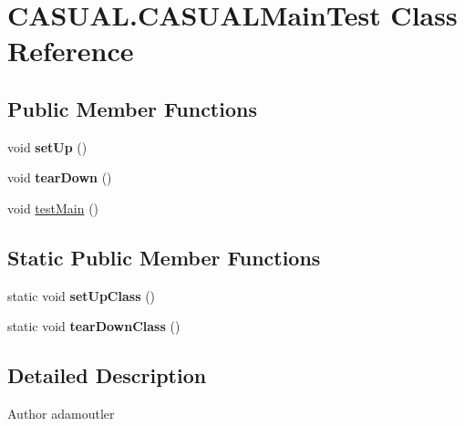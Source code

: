 \hypertarget{class_c_a_s_u_a_l_1_1_c_a_s_u_a_l_main_test}{\section{C\-A\-S\-U\-A\-L.\-C\-A\-S\-U\-A\-L\-Main\-Test Class Reference}
\label{class_c_a_s_u_a_l_1_1_c_a_s_u_a_l_main_test}
}
\subsection*{Public Member Functions}
\begin{DoxyCompactItemize}
\item 
\hypertarget{class_c_a_s_u_a_l_1_1_c_a_s_u_a_l_main_test_aaa9a6f2548a1164472025718f01ad379}{void {\bfseries set\-Up} ()}\label{class_c_a_s_u_a_l_1_1_c_a_s_u_a_l_main_test_aaa9a6f2548a1164472025718f01ad379}

\item 
\hypertarget{class_c_a_s_u_a_l_1_1_c_a_s_u_a_l_main_test_a156fc7ec34def13912d1a805e1be5f23}{void {\bfseries tear\-Down} ()}\label{class_c_a_s_u_a_l_1_1_c_a_s_u_a_l_main_test_a156fc7ec34def13912d1a805e1be5f23}

\item 
void \hyperlink{class_c_a_s_u_a_l_1_1_c_a_s_u_a_l_main_test_a642ce2577da1d802bd97845f9f505949}{test\-Main} ()
\end{DoxyCompactItemize}
\subsection*{Static Public Member Functions}
\begin{DoxyCompactItemize}
\item 
\hypertarget{class_c_a_s_u_a_l_1_1_c_a_s_u_a_l_main_test_a3ac9e539ca60959f5724998e15229e3c}{static void {\bfseries set\-Up\-Class} ()}\label{class_c_a_s_u_a_l_1_1_c_a_s_u_a_l_main_test_a3ac9e539ca60959f5724998e15229e3c}

\item 
\hypertarget{class_c_a_s_u_a_l_1_1_c_a_s_u_a_l_main_test_a6d123ab347d12ee1e3951fd6fd7aea91}{static void {\bfseries tear\-Down\-Class} ()}\label{class_c_a_s_u_a_l_1_1_c_a_s_u_a_l_main_test_a6d123ab347d12ee1e3951fd6fd7aea91}

\end{DoxyCompactItemize}


\subsection{Detailed Description}
\begin{DoxyAuthor}{Author}
adamoutler 
\end{DoxyAuthor}


